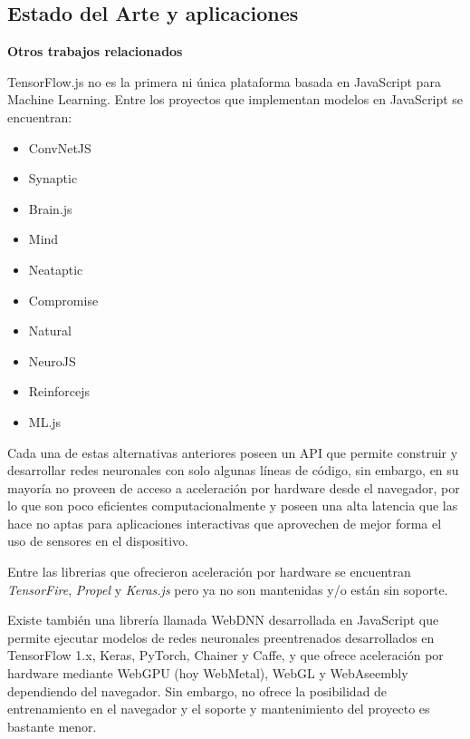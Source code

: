 \clearpage
\subsection{Estado del Arte y aplicaciones}


\textbf{Otros trabajos relacionados}

TensorFlow.js no es la primera ni única plataforma basada en JavaScript para Machine Learning.
Entre los proyectos que implementan modelos en JavaScript se encuentran:

\begin{itemize}
\item ConvNetJS \cite{ConvNetJSDeepLearning}
\item Synaptic \cite{cazalaCazalaSynaptic2020}
\item Brain.js \cite{BrainJSBrainJs2020}
\item Mind      \cite{millerStevenmiller888Mind2020}
\item Neataptic     \cite{wagenaarWagenaartjeNeataptic2020}
\item Compromise    \cite{kellySpencermountainCompromise2020}
\item Natural \cite{NaturalNodeNatural2020}
\item NeuroJS   \cite{janJanhuenermannNeurojs2020}
\item Reinforcejs \cite{andrejKarpathyReinforcejs2020}
\item ML.js     \cite{MljsMl2020}
\end{itemize}


 Cada una de estas alternativas anteriores poseen un API que permite construir y desarrollar redes neuronales con
 solo algunas líneas de código, sin embargo, en su mayoría no proveen de acceso a aceleración por hardware desde el
 navegador, por lo que son poco eficientes computacionalmente y poseen una alta latencia que las hace no
 aptas para aplicaciones interactivas que aprovechen de mejor forma el uso de sensores en el dispositivo.

Entre las librerias que ofrecieron aceleración por hardware se encuentran \emph{TensorFire}\cite{TensorFire},
\emph{Propel}\cite{PropelmlPropel2020} y \emph{Keras.js}\cite{TranscranialKerasjsRun}
pero ya no son mantenidas y/o están sin soporte.

Existe también una librería llamada WebDNN \cite{MILWebDNN} desarrollada en JavaScript que permite ejecutar modelos
de redes neuronales
preentrenados desarrollados en TensorFlow 1.x, Keras, PyTorch, Chainer y Caffe, y que ofrece aceleración
por hardware mediante WebGPU (hoy WebMetal), WebGL \cite{WebGLOpenGLES2011} y WebAseembly \cite{haasBringingWebSpeed2017} dependiendo del navegador.
Sin embargo,
no ofrece la posibilidad de entrenamiento en el navegador y el soporte y mantenimiento del proyecto es bastante menor.


